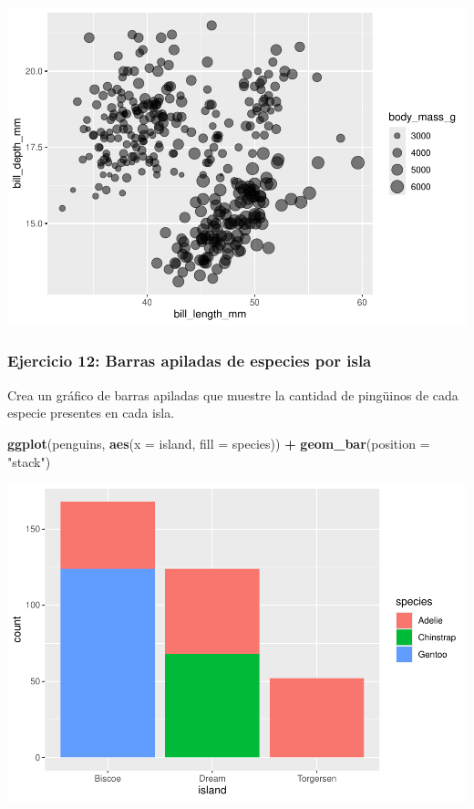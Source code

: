 \documentclass[
]{book}
\newenvironment{Shaded}{\begin{snugshade}}{\end{snugshade}}
\newcommand{\AttributeTok}[1]{\textcolor[rgb]{0.13,0.29,0.53}{#1}}
\newcommand{\FunctionTok}[1]{\textcolor[rgb]{0.13,0.29,0.53}{\textbf{#1}}}
\newcommand{\NormalTok}[1]{#1}
\newcommand{\SpecialCharTok}[1]{\textcolor[rgb]{0.81,0.36,0.00}{\textbf{#1}}}
\newcommand{\StringTok}[1]{\textcolor[rgb]{0.31,0.60,0.02}{#1}}
\begin{document}
\includegraphics{bookdown-demo_files/figure-latex/unnamed-chunk-193-1.pdf}

\subsubsection{Ejercicio 12: Barras apiladas de especies por isla}\label{ejercicio-12-barras-apiladas-de-especies-por-isla}

Crea un gráfico de barras apiladas que muestre la cantidad de pingüinos de cada especie presentes en cada isla.

\begin{Shaded}
\begin{Highlighting}[]
\FunctionTok{ggplot}\NormalTok{(penguins, }\FunctionTok{aes}\NormalTok{(}\AttributeTok{x =}\NormalTok{ island, }\AttributeTok{fill =}\NormalTok{ species)) }\SpecialCharTok{+}
  \FunctionTok{geom\_bar}\NormalTok{(}\AttributeTok{position =} \StringTok{"stack"}\NormalTok{)}
\end{Highlighting}
\end{Shaded}

\includegraphics{bookdown-demo_files/figure-latex/unnamed-chunk-194-1.pdf}
\end{document}
